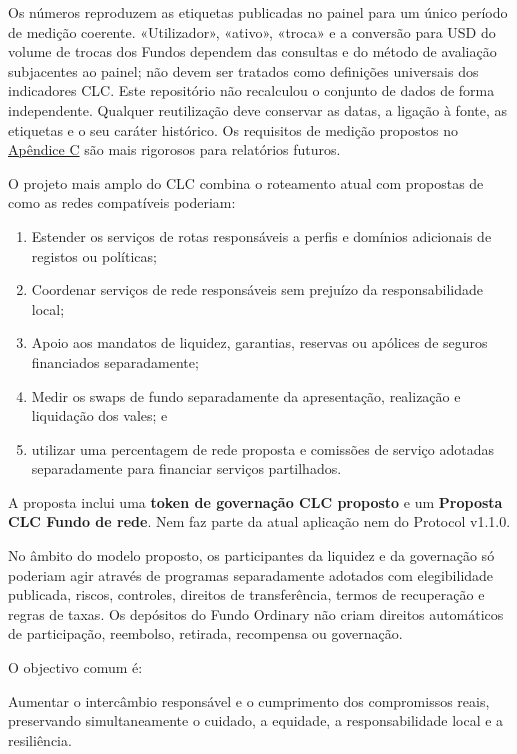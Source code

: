 \documentclass[11pt]{article}
\begin{document}
Os números reproduzem as etiquetas publicadas no painel para um único período de medição coerente. «Utilizador», «ativo», «troca» e a conversão para USD do volume de trocas dos Fundos dependem das consultas e do método de avaliação subjacentes ao painel; não devem ser tratados como definições universais dos indicadores CLC. Este repositório não recalculou o conjunto de dados de forma independente. Qualquer reutilização deve conservar as datas, a ligação à fonte, as etiquetas e o seu caráter histórico. Os requisitos de medição propostos no \href{https://docs.cosmolocal.credit/pt/white-paper/appendix-c-kpi-definitions}{Apêndice C} são mais rigorosos para relatórios futuros.

O projeto mais amplo do CLC combina o roteamento atual com propostas de como as redes compatíveis poderiam:

\begin{enumerate}[leftmargin=*]
\item Estender os serviços de rotas responsáveis a perfis e domínios adicionais de registos ou políticas;
\item Coordenar serviços de rede responsáveis sem prejuízo da responsabilidade local;
\item Apoio aos mandatos de liquidez, garantias, reservas ou apólices de seguros financiados separadamente;
\item Medir os swaps de fundo separadamente da apresentação, realização e liquidação dos vales; e
\item utilizar uma percentagem de rede proposta e comissões de serviço adotadas separadamente para financiar serviços partilhados.
\end{enumerate}
A proposta inclui uma \textbf{token de governação CLC proposto} e um \textbf{Proposta CLC Fundo de rede}. Nem faz parte da atual aplicação nem do Protocol v1.1.0.

No âmbito do modelo proposto, os participantes da liquidez e da governação só poderiam agir através de programas separadamente adotados com elegibilidade publicada, riscos, controles, direitos de transferência, termos de recuperação e regras de taxas. Os depósitos do Fundo Ordinary não criam direitos automáticos de participação, reembolso, retirada, recompensa ou governação.

O objectivo comum é:

Aumentar o intercâmbio responsável e o cumprimento dos compromissos reais, preservando simultaneamente o cuidado, a equidade, a responsabilidade local e a resiliência.
\end{document}
